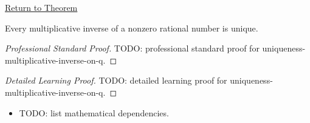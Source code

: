 \newpage
{}
\label{prf:uniqueness-multiplicative-inverse-on-q}

\begin{remark*}[Return]
\hyperref[cor:uniqueness-multiplicative-inverse-on-q]{Return to Theorem}
\end{remark*}

\begin{corollary*}
Every multiplicative inverse of a nonzero rational number is unique.
\end{corollary*}

\begin{proof}[Professional Standard Proof]
\LRAProofBodyStart
TODO: professional standard proof for uniqueness-multiplicative-inverse-on-q.
\end{proof}

\begin{proof}[Detailed Learning Proof]
\LRAProofBodyStart
TODO: detailed learning proof for uniqueness-multiplicative-inverse-on-q.
\end{proof}

\begin{remark*}
\end{remark*}

\begin{dependencies}
\begin{itemize}
  \item TODO: list mathematical dependencies.
\end{itemize}
\end{dependencies}

\clearpage
